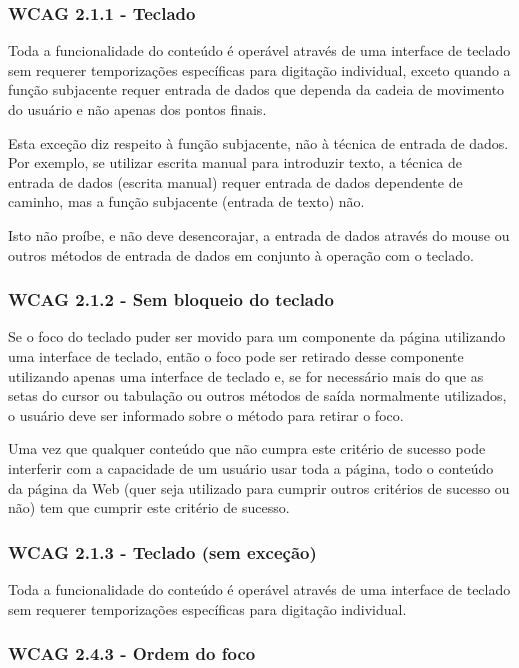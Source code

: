 \documentclass[a4paper]{article}
\begin{document}
\begin{titlepage}
\subsubsection{WCAG 2.1.1 - Teclado}

Toda a funcionalidade do conteúdo é operável através de uma interface de teclado sem requerer temporizações específicas para digitação individual, exceto quando a função subjacente requer entrada de dados que dependa da cadeia de movimento do usuário e não apenas dos pontos finais.

Esta exceção diz respeito à função subjacente, não à técnica de entrada de dados. Por exemplo, se utilizar escrita manual para introduzir texto, a técnica de entrada de dados (escrita manual) requer entrada de dados dependente de caminho, mas a função subjacente (entrada de texto) não.

Isto não proíbe, e não deve desencorajar, a entrada de dados através do mouse ou outros métodos de entrada de dados em conjunto à operação com o teclado.

\subsubsection{WCAG 2.1.2 - Sem bloqueio do teclado}

Se o foco do teclado puder ser movido para um componente da página utilizando uma interface de teclado, então o foco pode ser retirado desse componente utilizando apenas uma interface de teclado e, se for necessário mais do que as setas do cursor ou tabulação ou outros métodos de saída normalmente utilizados, o usuário deve ser informado sobre o método para retirar o foco.

Uma vez que qualquer conteúdo que não cumpra este critério de sucesso pode interferir com a capacidade de um usuário usar toda a página, todo o conteúdo da página da Web (quer seja utilizado para cumprir outros critérios de sucesso ou não) tem que cumprir este critério de sucesso.

\subsubsection{WCAG 2.1.3 - Teclado (sem exceção)}

Toda a funcionalidade do conteúdo é operável através de uma interface de teclado sem requerer temporizações específicas para digitação individual.

\subsubsection{WCAG 2.4.3 - Ordem do foco}


\end{titlepage}
\end{document}
